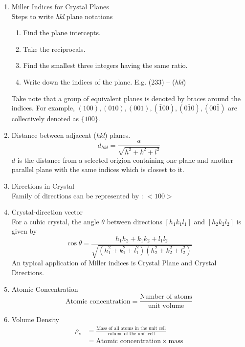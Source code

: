 \begin{enumerate}
\begin{center}
    \end{center}
    \item Miller Indices for Crystal Planes\\
    Steps to write \textit{hkl} plane notations
    \begin{enumerate}
        \item Find the plane intercepts.
        \item Take the reciprocals.
        \item Find the smallest three integers having the same ratio.
        \item Write down the indices of the plane. E.g. (233) -- (\textit{hkl})
    \end{enumerate}
    Take note that a group of equivalent planes is denoted by braces around the indices. For example, $(100),(010),(001),(\bar{1}00),(0\bar{1}0),(00\bar{1})$ are collectively denoted as $\{100\}$.
    \item Distance between adjacent (\textit{hkl}) planes.\\
    \begin{equation}
        d_{hkl} = \frac{a}{\sqrt{h^2+k^2+l^2}}
    \end{equation}
    $d$ is the distance from a selected origion containing one plane and another parallel plane with the same indices which is closest to it.
    \item Directions in Crystal \\
    Family of directions can be represented by : $<100>$
    \item Crystal-direction vector \\
    For a cubic crystal, the angle $\theta$ between directions $[h_1k_1l_1]$ and $[h_2k_2l_2]$ is given by
    \begin{equation}
        \cos \theta = \frac{h_1h_2+k_1k_2+l_1l_2}{\sqrt{(h_1^2+k_1^2+l_1^2)(h_2^2+k_2^2+l_2^2)}}
    \end{equation}
    An typical application of Miller indices is Crystal Plane and Crystal Directions.
    \item Atomic Concentration 
    \[\text{Atomic concentration} = \frac{\text{Number of atoms}}{\text{unit volume}}\]
    \item Volume Density 
    \begin{align*}
        \rho_\nu &= \frac{\text{Mass of all atoms in the unit cell}}{\text{volume of the unit cell}} \\
        &= \text{Atomic concentration} \times \text{mass}
    \end{align*}

\end{enumerate}
